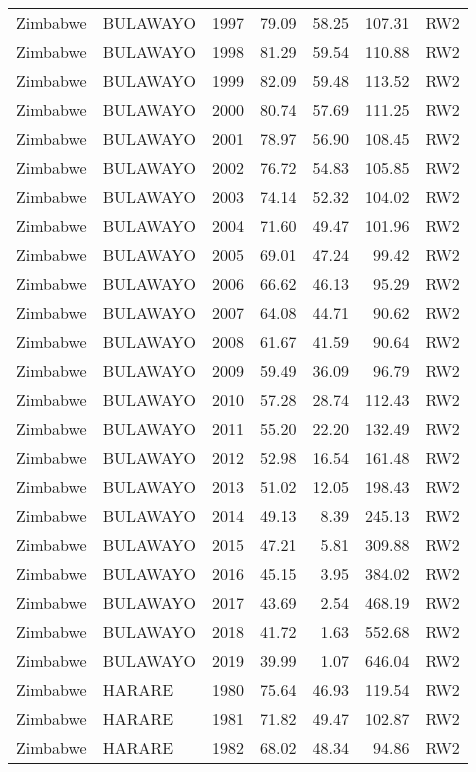 \begin{longtable}{lllrrrl}
  Zimbabwe & BULAWAYO & 1997 & 79.09 & 58.25 & 107.31 & RW2 \\ 
  Zimbabwe & BULAWAYO & 1998 & 81.29 & 59.54 & 110.88 & RW2 \\ 
  Zimbabwe & BULAWAYO & 1999 & 82.09 & 59.48 & 113.52 & RW2 \\ 
  Zimbabwe & BULAWAYO & 2000 & 80.74 & 57.69 & 111.25 & RW2 \\ 
  Zimbabwe & BULAWAYO & 2001 & 78.97 & 56.90 & 108.45 & RW2 \\ 
  Zimbabwe & BULAWAYO & 2002 & 76.72 & 54.83 & 105.85 & RW2 \\ 
  Zimbabwe & BULAWAYO & 2003 & 74.14 & 52.32 & 104.02 & RW2 \\ 
  Zimbabwe & BULAWAYO & 2004 & 71.60 & 49.47 & 101.96 & RW2 \\ 
  Zimbabwe & BULAWAYO & 2005 & 69.01 & 47.24 & 99.42 & RW2 \\ 
  Zimbabwe & BULAWAYO & 2006 & 66.62 & 46.13 & 95.29 & RW2 \\ 
  Zimbabwe & BULAWAYO & 2007 & 64.08 & 44.71 & 90.62 & RW2 \\ 
  Zimbabwe & BULAWAYO & 2008 & 61.67 & 41.59 & 90.64 & RW2 \\ 
  Zimbabwe & BULAWAYO & 2009 & 59.49 & 36.09 & 96.79 & RW2 \\ 
  Zimbabwe & BULAWAYO & 2010 & 57.28 & 28.74 & 112.43 & RW2 \\ 
  Zimbabwe & BULAWAYO & 2011 & 55.20 & 22.20 & 132.49 & RW2 \\ 
  Zimbabwe & BULAWAYO & 2012 & 52.98 & 16.54 & 161.48 & RW2 \\ 
  Zimbabwe & BULAWAYO & 2013 & 51.02 & 12.05 & 198.43 & RW2 \\ 
  Zimbabwe & BULAWAYO & 2014 & 49.13 & 8.39 & 245.13 & RW2 \\ 
  Zimbabwe & BULAWAYO & 2015 & 47.21 & 5.81 & 309.88 & RW2 \\ 
  Zimbabwe & BULAWAYO & 2016 & 45.15 & 3.95 & 384.02 & RW2 \\ 
  Zimbabwe & BULAWAYO & 2017 & 43.69 & 2.54 & 468.19 & RW2 \\ 
  Zimbabwe & BULAWAYO & 2018 & 41.72 & 1.63 & 552.68 & RW2 \\ 
  Zimbabwe & BULAWAYO & 2019 & 39.99 & 1.07 & 646.04 & RW2 \\ 
  Zimbabwe & HARARE & 1980 & 75.64 & 46.93 & 119.54 & RW2 \\ 
  Zimbabwe & HARARE & 1981 & 71.82 & 49.47 & 102.87 & RW2 \\ 
  Zimbabwe & HARARE & 1982 & 68.02 & 48.34 & 94.86 & RW2 \\ 

\end{longtable}
